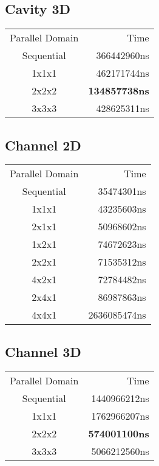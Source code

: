 \documentclass[
  english,        %
  font=palatino,     %
  onecolumn,      %
]{tumarticle}
\begin{document}
\subsection{Cavity 3D}

\begin{tabular}{c r}
  Parallel Domain & Time                 \\
  Sequential      & 366442960ns          \\
  1x1x1           & 462171744ns          \\
  2x2x2           & \textbf{134857738ns} \\
  3x3x3           & 428625311ns          \\
\end{tabular}

\subsection{Channel 2D}

\begin{tabular}{c r}
  Parallel Domain & Time         \\
  Sequential      & 35474301ns   \\
  1x1x1           & 43235603ns   \\
  2x1x1           & 50968602ns   \\
  1x2x1           & 74672623ns   \\
  2x2x1           & 71535312ns   \\
  4x2x1           & 72784482ns   \\
  2x4x1           & 86987863ns   \\
  4x4x1           & 2636085474ns \\
\end{tabular}

\subsection{Channel 3D}

\begin{tabular}{c r}
  Parallel Domain & Time                 \\
  Sequential      & 1440966212ns         \\
  1x1x1           & 1762966207ns         \\
  2x2x2           & \textbf{574001100ns} \\
  3x3x3           & 5066212560ns         \\
\end{tabular}
\end{document}
